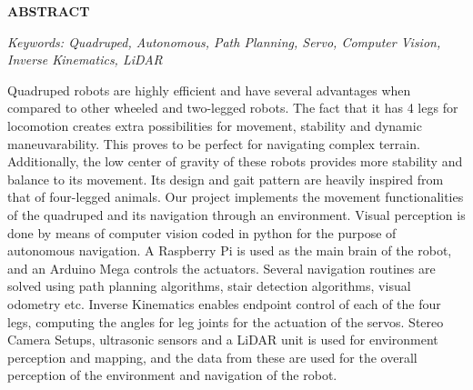 \begin{center}
    \Large \textbf{ABSTRACT}\\
\end{center}
\vspace{0.5cm} 

\textit{Keywords: Quadruped, Autonomous, Path Planning, Servo, Computer Vision, Inverse Kinematics, LiDAR}
\vspace{0.5cm}

Quadruped robots are highly efficient and have several advantages when compared to other wheeled and two-legged robots. The fact that it has 4 legs for locomotion creates extra possibilities for movement, stability and dynamic maneuvarability. This proves to be perfect for navigating complex terrain. Additionally, the low center of gravity of these robots provides more stability and balance to its movement. Its design and gait pattern are heavily inspired from that of four-legged animals. Our project implements the movement functionalities of the quadruped and its navigation through an environment. Visual perception is done by means of computer vision coded in python for the purpose of autonomous navigation. A Raspberry Pi is used as the main brain of the robot, and an Arduino Mega controls the actuators. Several navigation routines are solved using path planning algorithms, stair detection algorithms, visual odometry etc. Inverse Kinematics enables endpoint control of each of the four legs, computing the angles for leg joints for the actuation of the servos. Stereo Camera Setups, ultrasonic sensors and a LiDAR unit is used for environment perception and mapping, and the data from these are used for the overall perception of the environment and navigation of the robot.